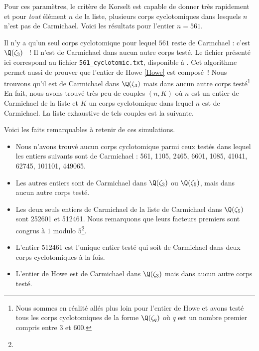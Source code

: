 Pour ces paramètres, le critère de Korselt est capable de donner très rapidement et pour \emph{tout} élément $n$ de la liste, plusieurs corps cyclotomiques dans lesquels $n$ n'est pas de Carmichael. Voici les résultats pour l'entier $n = 561$.

\vspace{1em}

Il n'y a qu'un seul corps cyclotomique pour lequel $561$ reste de Carmchael : c'est $\Q(\zeta_3)$ ~! Il n'est de Carmichael dans aucun autre corps testé. Le fichier présenté ici correspond au fichier \texttt{561\_cyclotomic.txt}, disponible à . Cet algorithme permet aussi de prouver que l'entier de Howe \ref{Howe} est composé~! Nous trouvons qu'il est de Carmichael dans $\Q(\zeta_3)$ mais dans aucun autre corps testé\footnote{Nous sommes en réalité allés plus loin pour l'entier de Howe et avons testé tous les corps cyclotomiques de la forme $\Q(\zeta_q)$ où $q$ est un nombre premier compris entre $3$ et $600$.} En fait, nous avons trouvé très peu de couples $(n, K)$ où $n$ est un entier de Carmichael de la liste et $K$ un corps cyclotomique dans lequel $n$ est de Carmichael. La liste exhaustive de tels couples est la suivante.

\vspace{1em}

Voici les faits remarquables à retenir de ces simulations.
	\begin{itemize}
		\item Nous n'avons trouvé aucun corps cyclotomique parmi ceux testés dans lequel les entiers suivants sont de Carmichael : 561, 1105, 2465, 6601, 1085, 41041, 62745, 101101, 449065.
		\item Les autres entiers sont de Carmichael dans $\Q(\zeta_3)$ ou $\Q(\zeta_5)$, mais dans aucun autre corps testé.
		\item Les deux seuls entiers de Carmichael de la liste de Carmichael dans $\Q(\zeta_5)$ sont 252601 et 512461. Nous remarquons que leurs facteurs premiers sont congrus à $1$ modulo $5$\footnote{}.
		\item L'entier 512461 est l'unique entier testé qui soit de Carmichael dans deux corps cyclotomiques à la fois.
		\item L'entier de Howe est de Carmichael dans $\Q(\zeta_3)$ mais dans aucun autre corps testé.
	\end{itemize}

